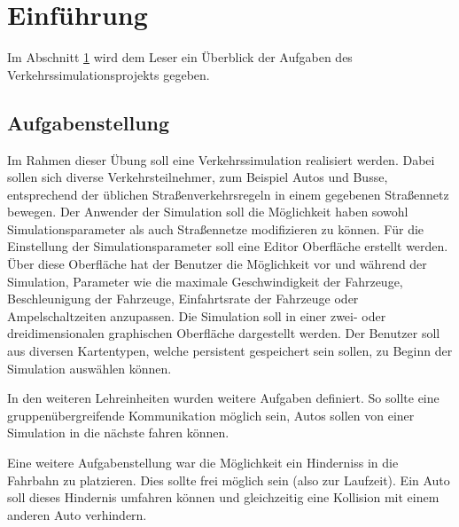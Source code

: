 
\chapter{Einführung}
\label{Einführung}

Im Abschnitt \ref{Einführung} wird dem Leser ein Überblick der Aufgaben des Verkehrssimulationsprojekts gegeben.

\thispagestyle{standard}
\pagestyle{standard}

\section{Aufgabenstellung}
\label{Aufgabenstellung}

Im Rahmen dieser Übung soll eine Verkehrssimulation realisiert werden. Dabei sollen sich diverse Verkehrsteilnehmer, zum Beispiel Autos und Busse, entsprechend der üblichen Straßenverkehrsregeln in einem gegebenen Straßennetz bewegen. Der Anwender der Simulation soll die Möglichkeit haben sowohl Simulationsparameter als auch Straßennetze modifizieren zu können. Für die Einstellung der Simulationsparameter soll eine Editor Oberfläche erstellt werden. Über diese Oberfläche hat der Benutzer die Möglichkeit vor und während der Simulation, Parameter wie die maximale Geschwindigkeit der Fahrzeuge, Beschleunigung der Fahrzeuge, Einfahrtsrate der Fahrzeuge oder Ampelschaltzeiten anzupassen. Die Simulation soll in einer zwei- oder dreidimensionalen graphischen Oberfläche dargestellt werden. Der Benutzer soll aus diversen Kartentypen, welche persistent gespeichert sein sollen, zu Beginn der Simulation auswählen können. 

In den weiteren Lehreinheiten wurden weitere Aufgaben definiert. So sollte eine gruppenübergreifende Kommunikation möglich sein, Autos sollen von einer Simulation in die nächste fahren können.

Eine weitere Aufgabenstellung war die Möglichkeit ein  Hinderniss in die Fahrbahn zu platzieren. Dies sollte frei möglich sein (also zur Laufzeit). Ein Auto soll dieses Hindernis umfahren können und gleichzeitig eine Kollision mit einem anderen Auto verhindern.



